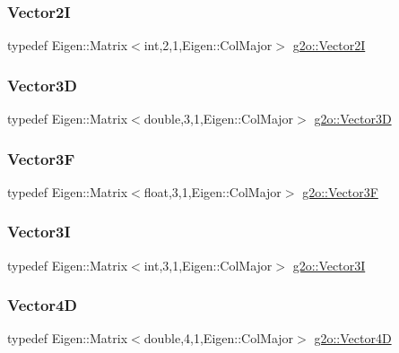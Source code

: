 \subsubsection{\texorpdfstring{Vector2I}{Vector2I}}
{\footnotesize\ttfamily typedef Eigen\+::\+Matrix$<$int,2,1,Eigen\+::\+Col\+Major$>$ \mbox{\hyperlink{namespaceg2o_affca5cbeca977d670b96298de84c5d2c}{g2o\+::\+Vector2I}}}

\mbox{\label{namespaceg2o_a944c2b1b0f84d33a7b297a4a585bf319}} 
\subsubsection{\texorpdfstring{Vector3D}{Vector3D}}
{\footnotesize\ttfamily typedef Eigen\+::\+Matrix$<$double,3,1,Eigen\+::\+Col\+Major$>$ \mbox{\hyperlink{namespaceg2o_a944c2b1b0f84d33a7b297a4a585bf319}{g2o\+::\+Vector3D}}}

\mbox{\label{namespaceg2o_a0c03efd6b49abac71bfb012cc3237288}} 
\subsubsection{\texorpdfstring{Vector3F}{Vector3F}}
{\footnotesize\ttfamily typedef Eigen\+::\+Matrix$<$float,3,1,Eigen\+::\+Col\+Major$>$ \mbox{\hyperlink{namespaceg2o_a0c03efd6b49abac71bfb012cc3237288}{g2o\+::\+Vector3F}}}

\mbox{\label{namespaceg2o_a501b6f80eef8d521f6fd1a31e8413f3a}} 
\subsubsection{\texorpdfstring{Vector3I}{Vector3I}}
{\footnotesize\ttfamily typedef Eigen\+::\+Matrix$<$int,3,1,Eigen\+::\+Col\+Major$>$ \mbox{\hyperlink{namespaceg2o_a501b6f80eef8d521f6fd1a31e8413f3a}{g2o\+::\+Vector3I}}}

\mbox{\label{namespaceg2o_afd9c8c912186d1f96141027c854fce42}} 
\subsubsection{\texorpdfstring{Vector4D}{Vector4D}}
{\footnotesize\ttfamily typedef Eigen\+::\+Matrix$<$double,4,1,Eigen\+::\+Col\+Major$>$ \mbox{\hyperlink{namespaceg2o_afd9c8c912186d1f96141027c854fce42}{g2o\+::\+Vector4D}}}

